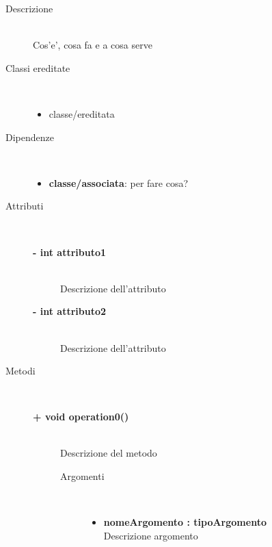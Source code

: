 \begin{description}
\item[Descrizione] \hfill \\
	Cos'e', cosa fa e a cosa serve
	
	
\item[Classi ereditate] \hfill \\
	\begin{itemize}
		\item classe/ereditata
	\end{itemize}
	
	
\item[Dipendenze] \hfill \\
	\begin{itemize}
		\item \textbf{classe/associata}: per fare cosa?
	\end{itemize}
	
	
\item[Attributi] \hfill \\
	\begin{description}
		\item[\textbf{- int attributo1			}] \hfill \\
			Descrizione dell'attributo
		\item[\textbf{- int attributo2			}] \hfill \\
			Descrizione dell'attributo
	\end{description}
	
	
\item[Metodi] \hfill \\

	\begin{description}
		\item[\textbf{\color{blue}+ void operation0()			}] \hfill \\
			Descrizione del metodo
			
		\begin{description}
			\item[Argomenti] \hfill \\
				\begin{itemize}
				
					\item \textbf{nomeArgomento : tipoArgomento			} \hfill \\
					Descrizione argomento
					

\end{itemize}
\end{description}
\end{description}
\end{description}
